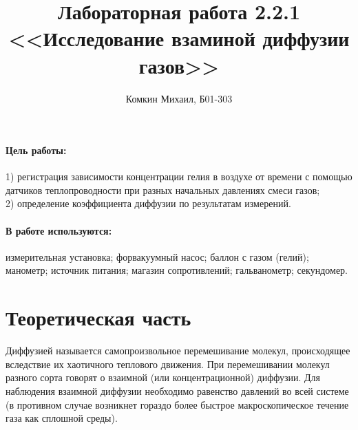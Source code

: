 \documentclass[12pt]{article}
\title{ 
    Лабораторная работа 2.2.1 \\
    <<Исследование взаминой диффузии газов>>
}
\author{Комкин Михаил, Б01-303}
\begin{document}
\maketitle
    \paragraph{Цель работы:}1) регистрация зависимости 
    концентрации гелия в воздухе от времени с помощью датчиков 
    теплопроводности при разных начальных давлениях смеси газов; \\
    2) определение коэффициента диффузии по результатам измерений.
    \paragraph{В работе используются:} измерительная установка; форвакуумный
    насос; баллон с газом (гелий); манометр; источник питания; магазин 
    сопротивлений; гальванометр; секундомер.
\section{Теоретическая часть} 
    Диффузией называется самопроизвольное перемешивание молекул, происходящее вследствие их 
    хаотичного теплового движения. При перемешивании молекул разного сорта говорят о 
    взаимной (или концентрационной) диффузии. Для наблюдения взаимной диффузии необходимо 
    равенство давлений во всей системе (в противном случае возникнет гораздо более быстрое 
    макроскопическое течение газа как сплошной среды).\\
\end{document}
